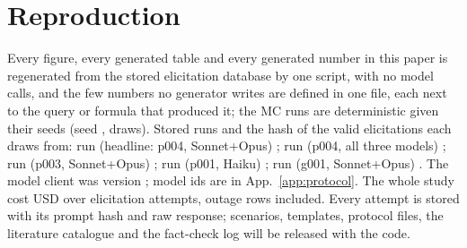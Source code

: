 \documentclass{article}
\begin{document}
\FloatBarrier
\section{Reproduction}
\label{app:repro}

Every figure, every generated table and every generated number in this paper is regenerated from the stored elicitation database by one script, with no model calls, and the few numbers no generator writes are defined in one file, each next to the query or formula that produced it; the MC runs are deterministic given their seeds (seed \voiSeed, \voiNDraws{} draws). Stored runs and the hash of the valid elicitations each draws from: run \voiRunId{} (headline: p004, Sonnet+Opus) \texttt{\voiDataHash}; run \voiallmRunId{} (p004, all three models) \texttt{\voiallmDataHash}; run \voisingleRunId{} (p003, Sonnet+Opus) \texttt{\voisingleDataHash}; run \voibaseRunId{} (p001, Haiku) \texttt{\voibaseDataHash}; run \voigaussRunId{} (g001, Sonnet+Opus) \texttt{\voigaussDataHash}. The model client was version \voiCliVersion; model ids are in App.~\ref{app:protocol}. The whole study cost \twStudyUSD{} USD over \twStudyAttempts{} elicitation attempts, outage rows included. Every attempt is stored with its prompt hash and raw response; scenarios, templates, protocol files, the literature catalogue and the fact-check log will be released with the code.
\end{document}
